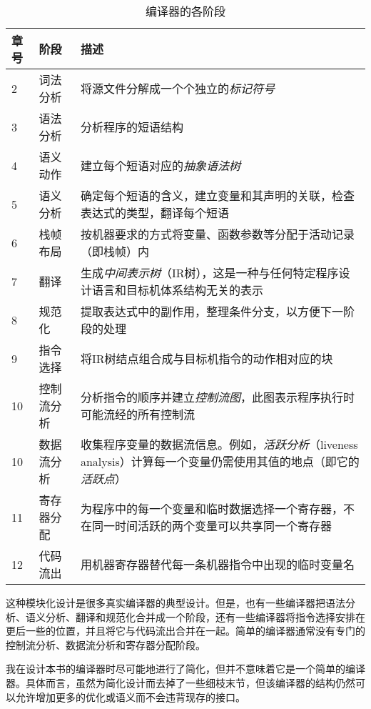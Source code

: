 \documentclass[cn,11pt,chinese]{elegantbook}
\begin{document}
\begin{table}[htbp]
  \centering
  \caption{编译器的各阶段}
    \begin{tabular}{p{1cm}|p{2cm}|p{10cm}}
    \toprule
    \textbf{章号} & \textbf{阶段} & \textbf{描述} \\
    \midrule
    2 & 词法分析 & 将源文件分解成一个个独立的\textit{标记符号} \\
    \midrule
    3 & 语法分析 & 分析程序的短语结构 \\
    \midrule
    4 & 语义动作 & 建立每个短语对应的\textit{抽象语法树} \\
    \midrule
    5 & 语义分析 & 确定每个短语的含义，建立变量和其声明的关联，检查表达式的类型，翻译每个短语 \\
    \midrule
    6 & 栈帧布局 & 按机器要求的方式将变量、函数参数等分配于活动记录（即栈帧）内 \\
    \midrule
    7 & 翻译 & 生成\textit{中间表示树}（IR树），这是一种与任何特定程序设计语言和目标机体系结构无关的表示 \\
    \midrule
    8 & 规范化 & 提取表达式中的副作用，整理条件分支，以方便下一阶段的处理 \\
    \midrule
    9 & 指令选择 & 将IR树结点组合成与目标机指令的动作相对应的块 \\
    \midrule
    10 & 控制流分析 & 分析指令的顺序并建立\textit{控制流图}，此图表示程序执行时可能流经的所有控制流 \\
    \midrule
    10 & 数据流分析 & 收集程序变量的数据流信息。例如，\textit{活跃分析}（liveness analysis）计算每一个变量仍需使用其值的地点（即它的\textit{活跃点}） \\
    \midrule
    11 & 寄存器分配 & 为程序中的每一个变量和临时数据选择一个寄存器，不在同一时间活跃的两个变量可以共享同一个寄存器 \\
    \midrule
    12 & 代码流出 & 用机器寄存器替代每一条机器指令中出现的临时变量名 \\
    \bottomrule
    \end{tabular}
  \label{tab:compiler-phases}
\end{table}

这种模块化设计是很多真实编译器的典型设计。但是，也有一些编译器把语法分析、语义分析、翻译和规范化合并成一个阶段，还有一些编译器将指令选择安排在更后一些的位置，并且将它与代码流出合并在一起。简单的编译器通常没有专门的控制流分析、数据流分析和寄存器分配阶段。

我在设计本书的编译器时尽可能地进行了简化，但并不意味着它是一个简单的编译器。具体而言，虽然为简化设计而去掉了一些细枝末节，但该编译器的结构仍然可以允许增加更多的优化或语义而不会违背现存的接口。
\end{document}

